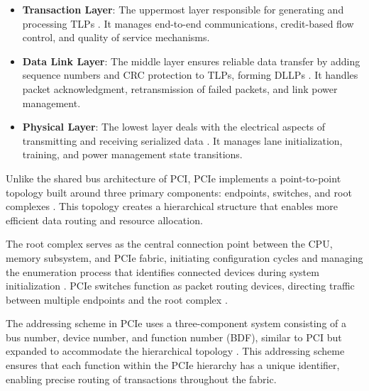 \begin{itemize}
    \item \textbf{Transaction Layer}: The uppermost layer responsible for generating 
    and processing \ac{TLP}s \parencite{budruk2003pci}. It manages end-to-end 
    communications, credit-based flow control, and quality of service mechanisms.
    \item \textbf{Data Link Layer}: The middle layer ensures reliable data transfer 
    by adding sequence numbers and \ac{CRC} protection to \ac{TLP}s, forming 
    \ac{DLLP}s \parencite{wilen2003understanding}. It handles packet 
    acknowledgment, retransmission of failed packets, and link power management.
    \item \textbf{Physical Layer}: The lowest layer deals with the electrical 
    aspects of transmitting and receiving serialized data \parencite{budruk2003pci}. 
    It manages lane initialization, training, and power management state transitions.
\end{itemize}

Unlike the shared bus architecture of \ac{PCI}, \ac{PCIe} implements 
a point-to-point topology built around three primary components: endpoints, 
switches, and root complexes \parencite[pp.~82-88]{solari2005pci}. 
This topology creates a hierarchical structure that enables more 
efficient data routing and resource allocation.

The root complex serves as the central connection point between 
the \ac{CPU}, memory subsystem, and \ac{PCIe} fabric, initiating 
configuration cycles and managing the enumeration process that 
identifies connected devices during system initialization 
\parencite{budruk2003pci}. \ac{PCIe} switches 
function as packet routing devices, directing traffic between 
multiple endpoints and the root complex \parencite[pp.~75-83]{wilen2003understanding}.

The addressing scheme in \ac{PCIe} uses a three-component system 
consisting of a bus number, device number, and function number 
(\ac{BDF}), similar to \ac{PCI} but expanded to accommodate the 
hierarchical topology \parencite[pp.~145-150]{solari2005pci}. 
This addressing scheme ensures that each function within the 
\ac{PCIe} hierarchy has a unique identifier, enabling precise 
routing of transactions throughout the fabric.
